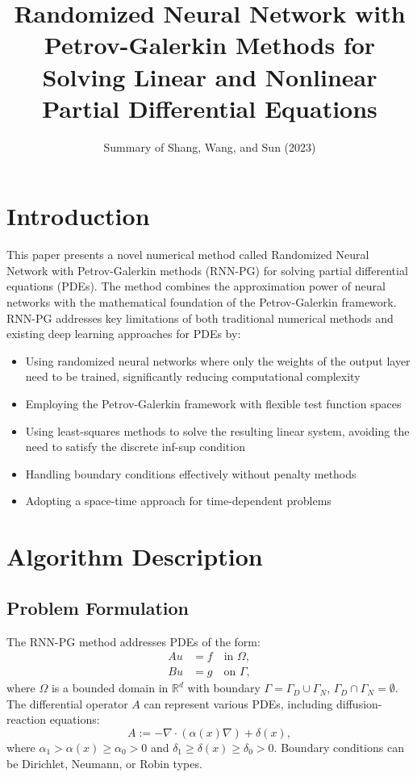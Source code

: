 \documentclass[11pt,a4paper]{article}
\title{Randomized Neural Network with Petrov-Galerkin Methods for Solving Linear and Nonlinear Partial Differential Equations}
\author{Summary of Shang, Wang, and Sun (2023)}
\date{}
\begin{document}
\maketitle

\section{Introduction}

This paper presents a novel numerical method called Randomized Neural Network with Petrov-Galerkin methods (RNN-PG) for solving partial differential equations (PDEs). The method combines the approximation power of neural networks with the mathematical foundation of the Petrov-Galerkin framework. RNN-PG addresses key limitations of both traditional numerical methods and existing deep learning approaches for PDEs by:

\begin{itemize}
    \item Using randomized neural networks where only the weights of the output layer need to be trained, significantly reducing computational complexity
    \item Employing the Petrov-Galerkin framework with flexible test function spaces
    \item Using least-squares methods to solve the resulting linear system, avoiding the need to satisfy the discrete inf-sup condition
    \item Handling boundary conditions effectively without penalty methods
    \item Adopting a space-time approach for time-dependent problems
\end{itemize}

\section{Algorithm Description}

\subsection{Problem Formulation}

The RNN-PG method addresses PDEs of the form:
\begin{align}
Au &= f \quad \textrm{in } \Omega, \\
Bu &= g \quad \textrm{on } \Gamma,
\end{align}
where $\Omega$ is a bounded domain in $\mathbb{R}^d$ with boundary $\Gamma = \Gamma_D \cup \Gamma_N$, $\Gamma_D \cap \Gamma_N = \emptyset$. The differential operator $A$ can represent various PDEs, including diffusion-reaction equations:
\begin{equation}
A := -\nabla \cdot(\alpha(x)\nabla) + \delta(x),
\end{equation}
where $\alpha_1 > \alpha(x) \geq \alpha_0 > 0$ and $\delta_1 \geq \delta(x) \geq \delta_0 > 0$. Boundary conditions can be Dirichlet, Neumann, or Robin types.
\end{document}
